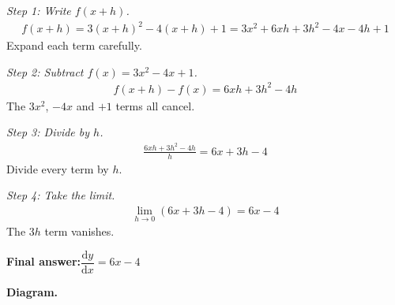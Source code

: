 \documentclass[11pt]{article}
\begin{document}
\textit{Step 1: Write \( f(x+h) \).}
\[\begin{gathered}
f(x+h) = 3(x+h)^2 - 4(x+h) + 1 = 3x^2 + 6xh + 3h^2 - 4x - 4h + 1
\end{gathered}\]
Expand each term carefully.

\textit{Step 2: Subtract \( f(x) = 3x^2 - 4x + 1 \).}
\[\begin{gathered}
f(x+h) - f(x) = 6xh + 3h^2 - 4h
\end{gathered}\]
The \( 3x^2 \), \( -4x \) and \( +1 \) terms all cancel.

\textit{Step 3: Divide by \( h \).}
\[\begin{gathered}
\frac{6xh + 3h^2 - 4h}{h} = 6x + 3h - 4
\end{gathered}\]
Divide every term by \( h \).

\textit{Step 4: Take the limit.}
\[\begin{gathered}
\lim_{h \to 0}(6x + 3h - 4) = 6x - 4
\end{gathered}\]
The \( 3h \) term vanishes.

\begin{answerbox}
\textbf{Final answer:}\quad \(\displaystyle  \dfrac{\mathrm{d}y}{\mathrm{d}x} = 6x - 4 \)
\end{answerbox}
\textbf{Diagram.}
\end{document}
